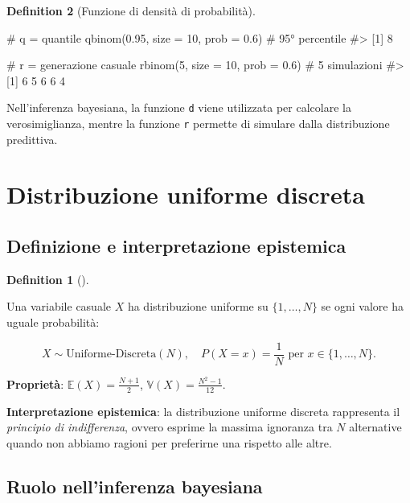 \documentclass[
  letterpaper,
  DIV=11,
  numbers=noendperiod,
  oneside]{scrreprt}
\newenvironment{Shaded}{\begin{snugshade}}{\end{snugshade}}
\newcommand{\AttributeTok}[1]{\textcolor[rgb]{0.40,0.45,0.13}{#1}}
\newcommand{\CommentTok}[1]{\textcolor[rgb]{0.37,0.37,0.37}{#1}}
\newcommand{\DecValTok}[1]{\textcolor[rgb]{0.68,0.00,0.00}{#1}}
\newcommand{\FloatTok}[1]{\textcolor[rgb]{0.68,0.00,0.00}{#1}}
\newcommand{\FunctionTok}[1]{\textcolor[rgb]{0.28,0.35,0.67}{#1}}
\newcommand{\NormalTok}[1]{\textcolor[rgb]{0.00,0.23,0.31}{#1}}
\theoremstyle{definition}
\theoremstyle{plain}
\theoremstyle{definition}
\newtheorem{definition}{Definition}[chapter]
\theoremstyle{remark}
\begin{document}
\begin{definition}[Funzione di densità di
probabilità]
\begin{Shaded}
\begin{Highlighting}[]
\CommentTok{\# q = quantile}
\FunctionTok{qbinom}\NormalTok{(}\FloatTok{0.95}\NormalTok{, }\AttributeTok{size =} \DecValTok{10}\NormalTok{, }\AttributeTok{prob =} \FloatTok{0.6}\NormalTok{)  }\CommentTok{\# 95° percentile}
\CommentTok{\#\textgreater{} [1] 8}

\CommentTok{\# r = generazione casuale}
\FunctionTok{rbinom}\NormalTok{(}\DecValTok{5}\NormalTok{, }\AttributeTok{size =} \DecValTok{10}\NormalTok{, }\AttributeTok{prob =} \FloatTok{0.6}\NormalTok{)  }\CommentTok{\# 5 simulazioni}
\CommentTok{\#\textgreater{} [1] 6 5 6 6 4}
\end{Highlighting}
\end{Shaded}

Nell'inferenza bayesiana, la funzione \texttt{d} viene utilizzata per
calcolare la verosimiglianza, mentre la funzione \texttt{r} permette di
simulare dalla distribuzione predittiva.

\section{Distribuzione uniforme
discreta}\label{distribuzione-uniforme-discreta}

\subsection{Definizione e interpretazione
epistemica}\label{definizione-e-interpretazione-epistemica-1}

\begin{definition}[]\protect\hypertarget{def-uniform-discrete}{}\label{def-uniform-discrete}

Una variabile casuale \(X\) ha distribuzione uniforme su
\(\{1, \dots, N\}\) se ogni valore ha uguale probabilità:

\[
X \sim \text{Uniforme-Discreta}(N), \quad P(X = x) = \frac{1}{N} \text{ per } x \in \{1, \ldots, N\}.
\]

\textbf{Proprietà}: \(\mathbb{E}(X) = \frac{N+1}{2}\),
\(\mathbb{V}(X) = \frac{N^2-1}{12}\).

\end{definition}

\textbf{Interpretazione epistemica}: la distribuzione uniforme discreta
rappresenta il \emph{principio di indifferenza}, ovvero esprime la
massima ignoranza tra \(N\) alternative quando non abbiamo ragioni per
preferirne una rispetto alle altre.

\subsection{Ruolo nell'inferenza
bayesiana}\label{ruolo-nellinferenza-bayesiana}


\end{definition}
\end{document}
